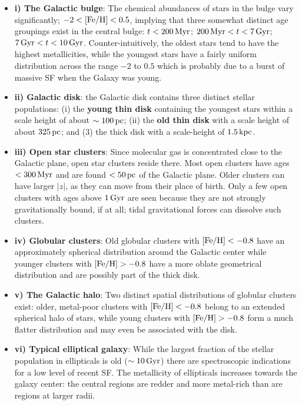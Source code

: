 \documentclass[a4paper,10pt]{article}
\begin{document}
\begin{itemize}
    \item \textbf{i) The Galactic bulge}: The chemical abundances of stars in the bulge vary significantly; $-2<[{\rm Fe/H}]<0.5$, implying that three somewhat distinct age groupings exist in the central bulge: $t<200\,{\rm Myr}$; $200\,{\rm Myr}<t<7\,{\rm Gyr}$; $7\,{\rm Gyr}<t<10\,{\rm Gyr}$. Counter-intuitively, the oldest stars tend to have the highest metallicities, while the youngest stars have a fairly uniform distribution across the range $-2$ to $0.5$ which is probably due to a burst of massive SF when the Galaxy was young.
    \item \textbf{ii) Galactic disk}: the Galactic disk contains three distinct stellar populations: (i) the \textbf{young thin disk} containing the youngest stars within a scale height of about $\sim100\,{\rm pc}$; (ii) the \textbf{old thin disk} with a scale height of about $325\,{\rm pc}$; and (3) the thick disk with a scale-height of $1.5\,{\rm kpc}$.
    \item \textbf{iii) Open star clusters}: Since molecular gas is concentrated close to the Galactic plane, open star clusters reside there. Most open clusters have ages $<300\,{\rm Myr}$ and are found $<50\,{\rm pc}$ of the Galactic plane. Older clusters can have larger $|z|$, as they can move from their place of birth. Only a few open clusters with ages above $1\,{\rm Gyr}$ are seen because they are not strongly gravitationally bound, if at all; tidal gravitational forces can dissolve such clusters.
    \item \textbf{iv) Globular clusters}: Old globular clusters with $[{\rm Fe/H}]<-0.8$ have an approximately spherical distribution around the Galactic center while younger clusters with $[{\rm Fe/H}]>-0.8$ have a more oblate geometrical distribution and are possibly part of the thick disk.
    \item \textbf{v) The Galactic halo}: Two distinct spatial distributions of globular clusters exist: older, metal-poor clusters with $[{\rm Fe/H}]<-0.8$ belong to an extended spherical halo of stars, while young clusters with $[{\rm Fe/H}]>-0.8$ form a much flatter distribution and may even be associated with the disk.
    \item \textbf{vi) Typical elliptical galaxy}: While the largest fraction of the stellar population in ellipticals is old ($\sim10\,{\rm Gyr}$) there are spectroscopic indications for a low level of recent SF. The metallicity of ellipticals increases towards the galaxy center: the central regions are redder and more metal-rich than are regions at larger radii.
\end{itemize}
\end{document}
